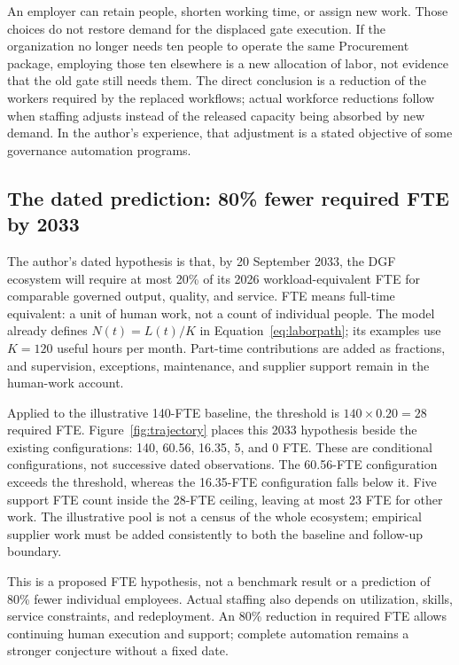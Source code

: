 An employer can retain people, shorten working time, or assign new work. Those choices do not restore
demand for the displaced gate execution. If the organization no longer needs ten people to operate the
same Procurement package, employing those ten elsewhere is a new allocation of labor, not evidence
that the old gate still needs them. The direct conclusion is a reduction of the workers required by
the replaced workflows; actual workforce reductions follow when staffing adjusts instead of the
released capacity being absorbed by new demand. In the author's experience, that adjustment is a stated
objective of some governance automation programs.

\subsection{The dated prediction: 80\% fewer required FTE by 2033}

The author's dated hypothesis is that, by 20 September 2033, the DGF ecosystem will require at most
20\% of its 2026 workload-equivalent FTE for comparable governed output, quality, and service.
FTE means full-time equivalent: a unit of human work, not a count of individual people. The model
already defines $N(t)=L(t)/K$ in Equation~\eqref{eq:laborpath}; its examples use $K=120$ useful
hours per month. Part-time contributions are added as fractions, and supervision, exceptions,
maintenance, and supplier support remain in the human-work account.

Applied to the illustrative 140-FTE baseline, the threshold is $140\times0.20=28$ required FTE.
Figure~\ref{fig:trajectory} places this 2033 hypothesis beside the existing configurations:
140, 60.56, 16.35, 5, and 0 FTE. These are conditional configurations, not successive dated
observations. The 60.56-FTE configuration exceeds the threshold, whereas the 16.35-FTE configuration
falls below it. Five support FTE count inside the 28-FTE ceiling, leaving at most 23 FTE for other work.
The illustrative pool is not a census of the whole ecosystem; empirical supplier work must be added
consistently to both the baseline and follow-up boundary.

This is a proposed FTE hypothesis, not a benchmark result or a prediction of 80\% fewer individual
employees. Actual staffing also depends on utilization, skills, service constraints, and redeployment.
An 80\% reduction in required FTE allows continuing human execution and support; complete automation
remains a stronger conjecture without a fixed date.

